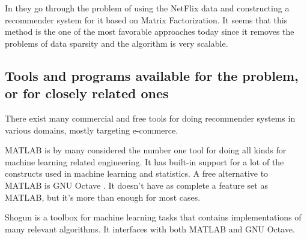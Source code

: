 \documentclass[a4paper,11pt]{article}
\begin{document}
In \cite{factorin} they go through the problem of using the NetFlix data and constructing a recommender system for it based on Matrix Factorization. It seems that this method is the one of the most favorable approaches today since it removes the problems of data sparsity and the algorithm is very scalable\cite{factorin}.

\subsection{Tools and programs available for the problem, or for closely related ones}
There exist many commercial and free tools for doing recommender systems in various domains, mostly targeting e-commerce.

MATLAB \cite{matlab-ml} is by many considered
the number one tool for doing all kinds for machine learning related engineering. It has built-in support for a lot of the constructs used in
machine learning and statistics. A free alternative to MATLAB is GNU Octave \cite{octave}. It doesn't have as complete a feature set
as MATLAB, but it's more than enough for most cases.

Shogun \cite{shogun} is a toolbox for machine learning tasks that contains implementations of many relevant algorithms. It interfaces with both MATLAB
and GNU Octave.




\end{document}
